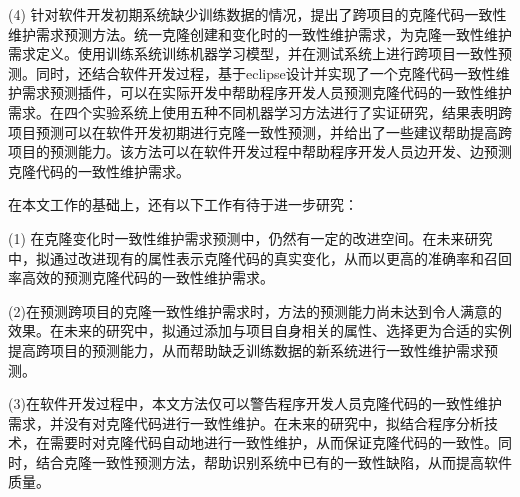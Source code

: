 (4) 针对软件开发初期系统缺少训练数据的情况，提出了跨项目的克隆代码一致性维护需求预测方法。统一克隆创建和变化时的一致性维护需求，为克隆一致性维护需求定义。使用训练系统训练机器学习模型，并在测试系统上进行跨项目一致性预测。同时，还结合软件开发过程，基于eclipse设计并实现了一个克隆代码一致性维护需求预测插件，可以在实际开发中帮助程序开发人员预测克隆代码的一致性维护需求。在四个实验系统上使用五种不同机器学习方法进行了实证研究，结果表明跨项目预测可以在软件开发初期进行克隆一致性预测，并给出了一些建议帮助提高跨项目的预测能力。该方法可以在软件开发过程中帮助程序开发人员边开发、边预测克隆代码的一致性维护需求。

在本文工作的基础上，还有以下工作有待于进一步研究：

(1) 在克隆变化时一致性维护需求预测中，仍然有一定的改进空间。在未来研究中，拟通过改进现有的属性表示克隆代码的真实变化，从而以更高的准确率和召回率高效的预测克隆代码的一致性维护需求。

(2)在预测跨项目的克隆一致性维护需求时，方法的预测能力尚未达到令人满意的效果。在未来的研究中，拟通过添加与项目自身相关的属性、选择更为合适的实例提高跨项目的预测能力，从而帮助缺乏训练数据的新系统进行一致性维护需求预测。

(3)在软件开发过程中，本文方法仅可以警告程序开发人员克隆代码的一致性维护需求，并没有对克隆代码进行一致性维护。在未来的研究中，拟结合程序分析技术，在需要时对克隆代码自动地进行一致性维护，从而保证克隆代码的一致性。同时，结合克隆一致性预测方法，帮助识别系统中已有的一致性缺陷，从而提高软件质量。